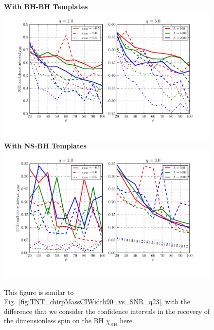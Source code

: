 \documentclass[aps,prd,amsmath,floats,floatfix, twocolumn,
superscriptaddress,nofootinbib,showpacs]{revtex4-1}
\begin{document}
\begin{figure}[h]
	\centering    
	\textbf{With BH-BH Templates}
	\includegraphics[width=2\columnwidth]{plots/TN_BHspinCIWidth90_vs_SNR_q23.pdf}\\ 
	\textbf{With NS-BH Templates}
	\includegraphics[width=2\columnwidth]{plots/TT_BHspinCIWidth90_vs_SNR_q23.pdf}%
	\caption{This figure is similar to Fig.~\ref{fig:TNT_chirpMassCIWidth90_vs_SNR_q23},
		with the difference that we consider the confidence intervals in the recovery
		of the dimensionless spin on the BH $\chi_\mathrm{BH}$ here.}
	\label{fig:TNT_BHspinCIWidth90_vs_SNR_q23}
\end{figure}
% 
\end{document}
